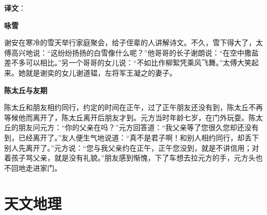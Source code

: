 \documentclass[12pt,UTF-8,openany,a4]{ctexbook}
\begin{document}
\newpage

\begin{Large}
   \noindent \textbf{译文}：
\end{Large}

\vspace{1em}

\begin{large}\yiwen
    
    \begin{center}{\Large\textbf{咏雪}}\end{center}
    
    谢安在寒冷的雪天举行家庭聚会，给子侄辈的人讲解诗文。不久，雪下得大了，太傅高兴地说：“这纷纷扬扬的白雪像什么呢？”他哥哥的长子谢朗说：“在空中撒盐差不多可以相比。”另一个哥哥的女儿说：“不如比作柳絮凭乘风飞舞。”太傅大笑起来。她就是谢奕的女儿谢道韫，左将军王凝之的妻子。
    
    \begin{center}{\Large\textbf{陈太丘与友期}}\end{center}
    
    陈太丘和朋友相约同行，约定的时间在正午，过了正午朋友还没有到，陈太丘不再等候他而离开了，陈太丘离开后朋友才到。元方当时年龄七岁，在门外玩耍。陈太丘的朋友问元方：“你的父亲在吗？”元方回答道：“我父亲等了您很久您却还没有到，已经离开了。”友人便生气地说道：“真不是君子啊！和别人相约同行，却丢下别人先离开了。”元方说：“您与我父亲约在正午，正午您没到，就是不讲信用；对着孩子骂父亲，就是没有礼貌。”朋友感到惭愧，下了车想去拉元方的手，元方头也不回地走进家门。
    

\end{large}



\chapter{天文地理}
\end{document}
